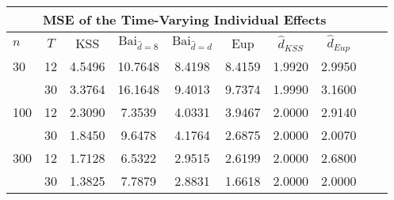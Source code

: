 \begin{tabular}{lccccccccc} 
\hline \multicolumn{8}{c}{MSE of the Time-Varying Individual Effects} \\ \hline 
$n$ & $T$ & KSS & $ \text{Bai}_{\hat{d} = 8}$ & $\text{Bai}_{\hat{d} = d}$ & Eup & $\hat{d}_{KSS}$ & $\hat{d}_{Eup}$ \\
\hline
30 & 12 &  4.5496  &  10.7648  &  8.4198  &  8.4159  &  1.9920  &  2.9950  \\
& 30 &  3.3764  &  16.1648  &  9.4013  &  9.7374  &  1.9990  &  3.1600  \\
100 & 12 &  2.3090  &  7.3539  &  4.0331  &  3.9467  &  2.0000  &  2.9140  \\
& 30 &  1.8450  &  9.6478  &  4.1764  &  2.6875  &  2.0000  &  2.0070  \\
300 & 12 &  1.7128  &  6.5322  &  2.9515  &  2.6199  &  2.0000  &  2.6800  \\
& 30 &  1.3825  &  7.7879  &  2.8831  &  1.6618  &  2.0000  &  2.0000  \\
\end{tabular} 
